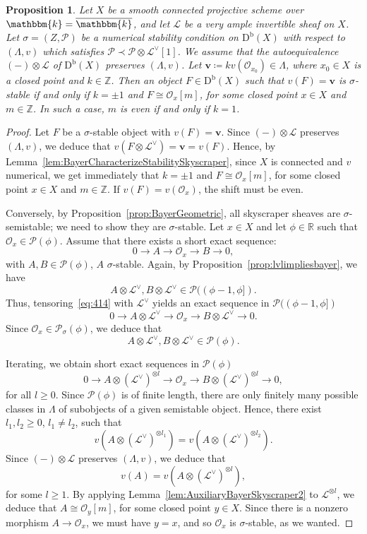 \documentclass[11pt, reqno]{amsart}
\numberwithin{equation}{section}
\theoremstyle{plain}
\newtheorem{proposition}[theorem]{Proposition}
\theoremstyle{remark}
\theoremstyle{definition}
\theoremstyle{italicsname}
\newcommand{\bv}{\mathbf{v}}
\newcommand{\Db}{\mathrm{D^b}}
\newcommand{\cO}{\mathcal{O}}
\newcommand{\cL}{\mathcal{L}}
\newcommand{\cP}{\mathscr{P}}
\newcommand{\KK}{\mathbbm{k}}
\def\RR{\ensuremath{\mathbb{R}}}
\def\ZZ{\ensuremath{\mathbb{Z}}}
\begin{document}
\begin{proposition}\label{prop:BayerCharacterizeStabilitySkyscraper}
Let $X$ be a smooth connected projective scheme over $\KK=\overline{\KK}$, and let $\cL$ be a very ample invertible sheaf on $X$.
Let $\sigma=(Z,\cP)$ be a numerical stability condition on $\Db(X)$ with respect to $(\Lambda,v)$ which satisfies $\cP\prec\cP\otimes\cL^\vee[1]$.
We assume that the autoequivalence $(-)\otimes\cL$ of $\Db(X)$ preserves $(\Lambda,v)$.
Let $\bv\coloneqq kv(\cO_{x_0})\in\Lambda$, where $x_0\in X$ is a closed point and $k\in\ZZ$.
Then an object $F\in\Db(X)$ such that $v(F)=\bv$ is $\sigma$-stable if and only if $k=\pm1$ and $F\cong\cO_x[m]$, for some closed point $x\in X$ and $m\in\ZZ$.
In such a case, $m$ is even if and only if $k=1$.
\end{proposition}

\begin{proof}
Let $F$ be a $\sigma$-stable object with $v(F)=\bv$.
Since $(-)\otimes\cL$ preserves $(\Lambda,v)$, we deduce that $v(F\otimes\cL^\vee)=\bv=v(F)$.
Hence, by Lemma~\ref{lem:BayerCharacterizeStabilitySkyscraper}, since $X$ is connected and $v$ numerical, we get immediately that $k=\pm1$ and $F\cong\cO_x[m]$, for some closed point $x\in X$ and $m\in\ZZ$.
If $v(F)=v(\cO_x)$, the shift must be even.

Conversely, by Proposition~\ref{prop:BayerGeometric}, all skyscraper sheaves are $\sigma$-semistable; we need to show they are $\sigma$-stable.
Let $x\in X$ and let $\phi\in\RR$ such that $\cO_x\in\cP(\phi)$.
Assume that there exists a short exact sequence:
\begin{equation}\label{eq:414}
0\longrightarrow A\longrightarrow\mathcal{O}_x\longrightarrow B\longrightarrow 0,
\end{equation}
with $A,B\in\cP(\phi)$, $A$ $\sigma$-stable.
Again, by Proposition~\ref{prop:lvlimpliesbayer}, we have
\[
A\otimes\cL^\vee,B\otimes\cL^\vee\in\cP((\phi-1,\phi]).
\]
Thus, tensoring~\eqref{eq:414} with $\cL^\vee$ yields an exact sequence in $\cP((\phi-1,\phi])$
\[
0\longrightarrow A\otimes\cL^\vee\longrightarrow\mathcal{O}_x\longrightarrow B\otimes\cL^\vee\longrightarrow 0. 
\]
Since $\mathcal{O}_x\in \cP_\sigma(\phi)$, we deduce that
\[
A\otimes\cL^\vee,B\otimes\cL^\vee\in\cP(\phi).
\]

Iterating, we obtain short exact sequences in $\cP(\phi)$
\[
0\longrightarrow A\otimes(\cL^\vee)^{\otimes l}\longrightarrow\mathcal{O}_x\longrightarrow B\otimes(\cL^\vee)^{\otimes l}\longrightarrow 0,
\]
for all $l\geq0$.
Since $\cP(\phi)$ is of finite length, there are only finitely many possible  classes in $\Lambda$ of subobjects of a given semistable object. 
Hence, there exist $l_1,l_2\geq0$, $l_1\neq l_2$, such that
\[
v(A\otimes(\cL^\vee)^{\otimes l_1})=v(A\otimes(\cL^\vee)^{\otimes l_2}).
\]
Since $(-)\otimes\cL$ preserves $(\Lambda,v)$, we deduce that
\[
v(A)=v(A\otimes(\cL^\vee)^{\otimes l}),
\]
for some $l\geq1$.
By applying Lemma~\ref{lem:AuxiliaryBayerSkyscraper2} to $\cL^{\otimes l}$, we deduce that $A\cong\cO_y[m]$, for some closed point $y\in X$.
Since there is a nonzero morphism $A\to\cO_x$, we must have $y=x$, and so $\cO_x$ is $\sigma$-stable, as we wanted. 
\end{proof}
\end{document}
